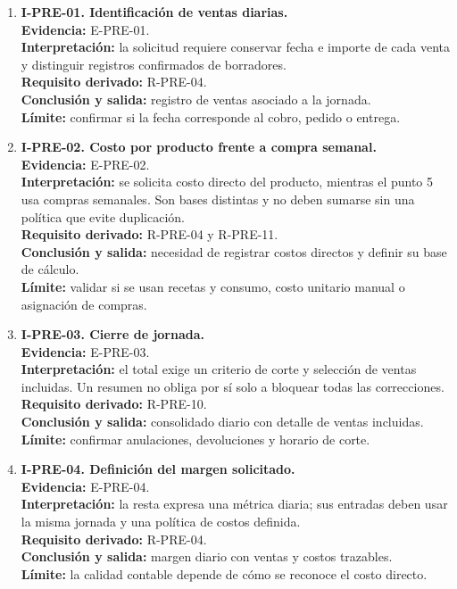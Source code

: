 \begin{enumerate}
  \item \textbf{I-PRE-01. Identificación de ventas diarias.}\\
  \textbf{Evidencia:} E-PRE-01.\\
  \textbf{Interpretación:} la solicitud requiere conservar fecha e importe
  de cada venta y distinguir registros confirmados de borradores.\\
  \textbf{Requisito derivado:} R-PRE-04.\\
  \textbf{Conclusión y salida:} registro de ventas asociado a la jornada.\\
  \textbf{Límite:} confirmar si la fecha corresponde al cobro, pedido o
  entrega.

  \item \textbf{I-PRE-02. Costo por producto frente a compra semanal.}\\
  \textbf{Evidencia:} E-PRE-02.\\
  \textbf{Interpretación:} se solicita costo directo del producto, mientras
  el punto 5 usa compras semanales. Son bases distintas y no deben sumarse
  sin una política que evite duplicación.\\
  \textbf{Requisito derivado:} R-PRE-04 y R-PRE-11.\\
  \textbf{Conclusión y salida:} necesidad de registrar costos directos y
  definir su base de cálculo.\\
  \textbf{Límite:} validar si se usan recetas y consumo, costo unitario
  manual o asignación de compras.

  \item \textbf{I-PRE-03. Cierre de jornada.}\\
  \textbf{Evidencia:} E-PRE-03.\\
  \textbf{Interpretación:} el total exige un criterio de corte y selección
  de ventas incluidas. Un resumen no obliga por sí solo a bloquear todas
  las correcciones.\\
  \textbf{Requisito derivado:} R-PRE-10.\\
  \textbf{Conclusión y salida:} consolidado diario con detalle de ventas
  incluidas.\\
  \textbf{Límite:} confirmar anulaciones, devoluciones y horario de corte.

  \item \textbf{I-PRE-04. Definición del margen solicitado.}\\
  \textbf{Evidencia:} E-PRE-04.\\
  \textbf{Interpretación:} la resta expresa una métrica diaria; sus entradas
  deben usar la misma jornada y una política de costos definida.\\
  \textbf{Requisito derivado:} R-PRE-04.\\
  \textbf{Conclusión y salida:} margen diario con ventas y costos trazables.\\
  \textbf{Límite:} la calidad contable depende de cómo se reconoce el costo
  directo.


\end{enumerate}
